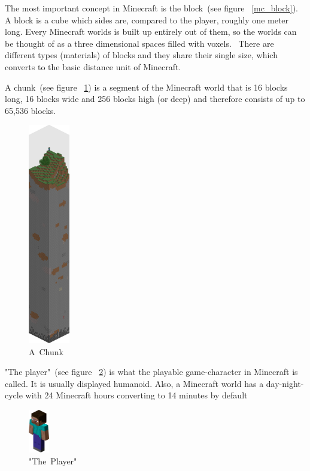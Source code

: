 The most important concept in Minecraft is the block~(see figure ~\ref{mc_block}). A block is a cube which sides are, compared to the player, roughly one meter long. Every Minecraft worlds is built up entirely out of them, so the worlds can be thought of as a three dimensional spaces filled with voxels.~\cite{baloghcodemetropolis} There are different types (materials) of blocks and they share their single size, which converts to the basic distance unit of Minecraft.

A chunk~(see figure ~\ref{mc_chunk}) is a segment of the Minecraft world that is 16 blocks long, 16 blocks wide and 256 blocks high (or deep) and therefore consists of up to 65,536 blocks.~\cite{mcwiki_chunks}

\begin{figure}
  \begin{center}
    \includegraphics[width=0.16\textwidth]{graphics/chunk}
  \end{center}
  \caption{A~Chunk~\cite{image_mob}}
  \label{mc_chunk}
\end{figure} 

"The player"~(see figure ~\ref{mc_player}) is what the playable game-character in Minecraft is called. It is usually displayed humanoid.
Also, a Minecraft world has a day-night-cycle with 24 Minecraft hours converting to 14 minutes by default

\begin{figure}
  \begin{center}
    \includegraphics[width=0.08\textwidth]{graphics/player}
  \end{center}
  \caption{"The~Player"~\cite{image_mob}}
  \label{mc_player}
\end{figure} 

